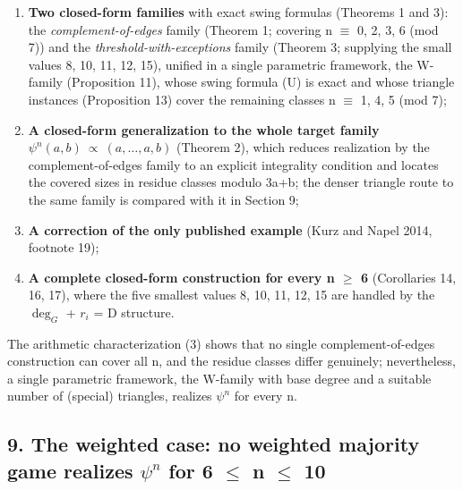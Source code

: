 \documentclass[
]{article}
\providecommand{\tightlist}{%
  \setlength{\itemsep}{0pt}\setlength{\parskip}{0pt}}
\begin{document}
\begin{enumerate}
\def\labelenumi{\arabic{enumi}.}
\tightlist
\item
  \textbf{Two closed-form families} with exact swing formulas (Theorems
  1 and 3): the \emph{complement-of-edges} family (Theorem 1; covering n
  \(\equiv\) 0, 2, 3, 6 (mod 7)) and the
  \emph{threshold-with-exceptions} family (Theorem 3; supplying the
  small values 8, 10, 11, 12, 15), unified in a single parametric
  framework, the W-family (Proposition 11), whose swing formula (U) is
  exact and whose triangle instances (Proposition 13) cover the
  remaining classes n \(\equiv\) 1, 4, 5 (mod 7);
\item
  \textbf{A closed-form generalization to the whole target family}
  \(\psi^n(a,b)\ \propto\ (a,\dots,a,b)\) (Theorem 2), which reduces
  realization by the complement-of-edges family to an explicit
  integrality condition and locates the covered sizes in residue classes
  modulo 3a+b; the denser triangle route to the same family is compared
  with it in Section 9;
\item
  \textbf{A correction of the only published example} (Kurz and Napel
  2014, footnote 19);
\item
  \textbf{A complete closed-form construction for every n \(\ge\) 6}
  (Corollaries 14, 16, 17), where the five smallest values 8, 10, 11,
  12, 15 are handled by the \(\deg_G\) + \(r_i\) = D structure.
\end{enumerate}

The arithmetic characterization (3) shows that no single
complement-of-edges construction can cover all n, and the residue
classes differ genuinely; nevertheless, a single parametric framework,
the W-family with base degree and a suitable number of (special)
triangles, realizes \(\psi^n\) for every n.

\subsection{\texorpdfstring{9. The weighted case: no weighted majority
game realizes \(\psi^n\) for 6 \(\le\) n \(\le\)
10}{9. The weighted case: no weighted majority game realizes \textbackslash psi\^{}n for 6 \textbackslash le n \textbackslash le 10}}\label{the-weighted-case-no-weighted-majority-game-realizes-ux3c8ux207f-for-6-n-10}
\end{document}
